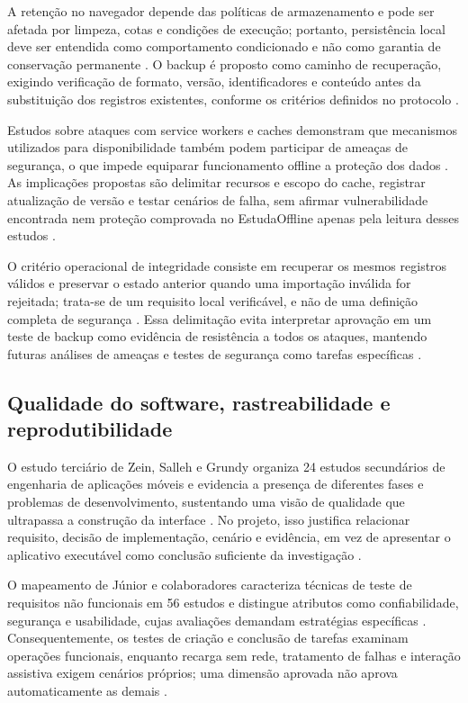 A retenção no navegador depende das políticas de armazenamento e pode ser afetada por limpeza, cotas e condições de execução; portanto, persistência local deve ser entendida como comportamento condicionado e não como garantia de conservação permanente \citep{local,quota}.
O backup é proposto como caminho de recuperação, exigindo verificação de formato, versão, identificadores e conteúdo antes da substituição dos registros existentes, conforme os critérios definidos no protocolo \citep{eng06}.

Estudos sobre ataques com service workers e caches demonstram que mecanismos utilizados para disponibilidade também podem participar de ameaças de segurança, o que impede equiparar funcionamento offline a proteção dos dados \citep{OS01,OS02}.
As implicações propostas são delimitar recursos e escopo do cache, registrar atualização de versão e testar cenários de falha, sem afirmar vulnerabilidade encontrada nem proteção comprovada no EstudaOffline apenas pela leitura desses estudos \citep{OS01,OS02}.

O critério operacional de integridade consiste em recuperar os mesmos registros válidos e preservar o estado anterior quando uma importação inválida for rejeitada; trata-se de um requisito local verificável, e não de uma definição completa de segurança \citep{eng06}.
Essa delimitação evita interpretar aprovação em um teste de backup como evidência de resistência a todos os ataques, mantendo futuras análises de ameaças e testes de segurança como tarefas específicas \citep{OS18,eng06}.

\subsection{Qualidade do software, rastreabilidade e reprodutibilidade}
O estudo terciário de Zein, Salleh e Grundy organiza 24 estudos secundários de engenharia de aplicações móveis e evidencia a presença de diferentes fases e problemas de desenvolvimento, sustentando uma visão de qualidade que ultrapassa a construção da interface \citep{eng04}.
No projeto, isso justifica relacionar requisito, decisão de implementação, cenário e evidência, em vez de apresentar o aplicativo executável como conclusão suficiente da investigação \citep{eng04}.

O mapeamento de Júnior e colaboradores caracteriza técnicas de teste de requisitos não funcionais em 56 estudos e distingue atributos como confiabilidade, segurança e usabilidade, cujas avaliações demandam estratégias específicas \citep{eng06}.
Consequentemente, os testes de criação e conclusão de tarefas examinam operações funcionais, enquanto recarga sem rede, tratamento de falhas e interação assistiva exigem cenários próprios; uma dimensão aprovada não aprova automaticamente as demais \citep{eng06}.

